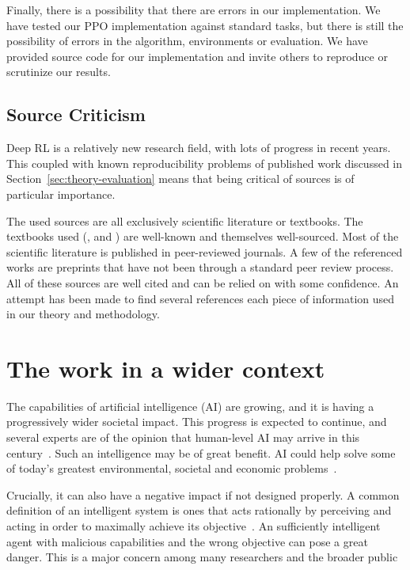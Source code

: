 Finally, there is a possibility that there are errors in our implementation.
We have tested our PPO implementation against standard tasks, but there is still the possibility of errors in the algorithm, environments or evaluation.
We have provided source code for our implementation and invite others to reproduce or scrutinize our results.

\subsection{Source Criticism}

Deep RL is a relatively new research field, with lots of progress in recent years.
This coupled with known reproducibility problems of published work discussed in Section~\ref{sec:theory-evaluation} means that being critical of sources is of particular importance.

The used sources are all exclusively scientific literature or textbooks.
The textbooks used (\cite{russell_artificial_2021}, \cite{sutton_reinforcement_2018} and \cite{goodfellow_deep_2016}) are well-known and themselves well-sourced.
Most of the scientific literature is published in peer-reviewed journals.
A few of the referenced works are preprints that have not been through a standard peer review process.
All of these sources are well cited and can be relied on with some confidence.
An attempt has been made to find several references each piece of information used in our theory and methodology.

\section{The work in a wider context}
\label{sec:discussion-wider}

The capabilities of artificial intelligence (AI) are growing, and it is having a progressively wider societal impact.
This progress is expected to continue, and several experts are of the opinion that human-level AI may arrive in this century~\cite{russell_provably_2022}.
Such an intelligence may be of great benefit.
AI could help solve some of today's greatest environmental, societal and economic problems~\cite{vinuesa_role_2020}.

Crucially, it can also have a negative impact if not designed properly.
A common definition of an intelligent system is ones that acts rationally by perceiving and acting in order to maximally achieve its objective~\cite{russell_provably_2022}.
An sufficiently intelligent agent with malicious capabilities and the wrong objective can pose a great danger.
This is a major concern among many researchers and the broader public~\cite{russell_research_2015,brundage_malicious_2018,vinuesa_role_2020,russell_provably_2022}

